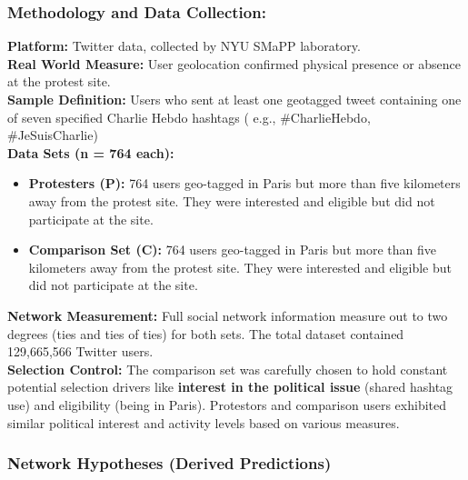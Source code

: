 \documentclass{article}
\begin{document}
    \subsubsection{Methodology and Data Collection:}

    \noindent \textbf{Platform:} Twitter data, collected by NYU SMaPP
laboratory.\\

    \noindent \textbf{Real World Measure:} User geolocation confirmed
physical presence or absence at the protest site.\\

    \noindent \textbf{Sample Definition:} Users who sent at least one
geotagged tweet containing one of seven specified Charlie Hebdo hashtags (
e.g., \#CharlieHebdo, \#JeSuisCharlie)\\

    \noindent \textbf{Data Sets (n = 764 each):}
    \begin{itemize}
        \item \textbf{Protesters (P):} 764 users geo-tagged in Paris but
        more than five kilometers away from the protest site. They were
        interested and eligible but did not participate at the site.
        \item \textbf{Comparison Set (C):} 764 users geo-tagged in Paris but
        more than five kilometers away from the protest site. They were
        interested and eligible but did not participate at the site.
    \end{itemize}

    \noindent \textbf{Network Measurement:} Full social network information
measure out to two degrees (ties and ties of ties) for both sets. The total
dataset contained 129,665,566 Twitter users.\\

    \noindent \textbf{Selection Control:} The comparison set was carefully
chosen to hold constant potential selection drivers like
\textbf{interest in the political issue} (shared hashtag use) and
eligibility (being in Paris). Protestors and comparison users exhibited
similar political interest and activity levels based on various measures.

    \subsubsection{Network Hypotheses (Derived Predictions)}
\end{document}
